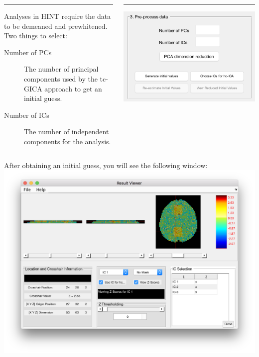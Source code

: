 \documentclass[11pt]{beamer}
\begin{document}
\begin{frame}
\begin{columns}[T] %
	\begin{column}{.6\textwidth}
		\color{black}\rule{\linewidth}{0pt}
		
Analyses in HINT require the data to be demeaned and prewhitened. Two things to select:

\begin{description}
\item[Number of PCs] The number of principal components used by the tc-GICA approach to get an initial guess.
\item[Number of ICs] The number of independent components for the analysis.
\end{description}
		
	\end{column}%
	\hfill%
	\begin{column}{.3\textwidth}
		\color{blue}\rule{\linewidth}{0pt}
		\includegraphics[width=1.2\linewidth]{figs/subpanelpreproc}
	\end{column}%
\end{columns}
\end{frame}

\begin{frame}
After obtaining an initial guess, you will see the following window:
\includegraphics[width=1\linewidth]{figs/iniGuess1}
\end{frame}
\end{document}

